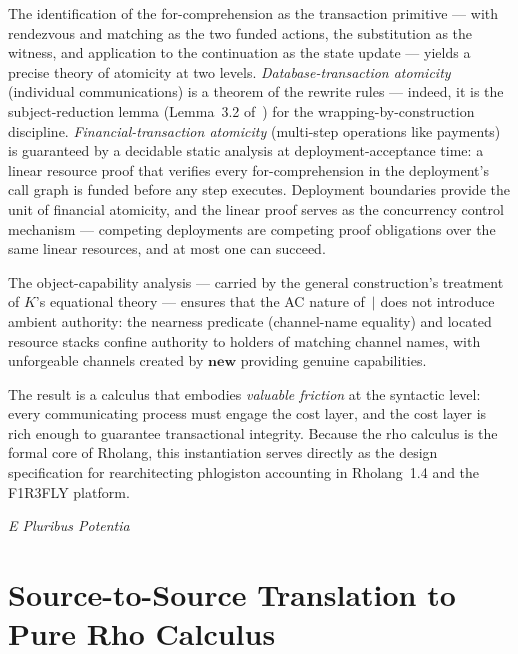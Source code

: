 \documentclass[11pt,a4paper]{article}
\newcommand{\Par}{\mathbin{|}}
\begin{document}
The identification of the for-comprehension as the transaction
primitive --- with rendezvous and matching as the two funded
actions, the substitution as the witness, and application to the
continuation as the state update --- yields a precise theory of
atomicity at two levels.  \emph{Database-transaction atomicity}
(individual communications) is a theorem of the rewrite rules
--- indeed, it is the subject-reduction lemma (Lemma~3.2
of~\cite{CostEndofunctor}) for the wrapping-by-construction
discipline.  \emph{Financial-transaction atomicity} (multi-step
operations like payments) is guaranteed by a decidable static
analysis at deployment-acceptance time: a linear resource proof
that verifies every for-comprehension in the deployment's call
graph is funded before any step executes.  Deployment boundaries
provide the unit of financial atomicity, and the linear proof
serves as the concurrency control mechanism --- competing
deployments are competing proof obligations over the same
linear resources, and at most one can succeed.

The object-capability analysis --- carried by the general
construction's treatment of $K$'s equational theory --- ensures
that the AC nature of~$\Par$ does not introduce ambient
authority: the nearness predicate (channel-name equality) and
located resource stacks confine authority to holders of matching
channel names, with unforgeable channels created by
$\mathbf{new}$ providing genuine capabilities.

The result is a calculus that embodies \emph{valuable friction}
at the syntactic level: every communicating process must engage
the cost layer, and the cost layer is rich enough to guarantee
transactional integrity.  Because the rho calculus is the formal
core of Rholang, this instantiation serves directly as the
design specification for rearchitecting phlogiston accounting in
Rholang~1.4 and the F1R3FLY platform.

\bigskip
\begin{flushright}
  \textit{E Pluribus Potentia}
\end{flushright}

\appendix

\section{Source-to-Source Translation to Pure Rho Calculus}
\label{app:translation}
\end{document}
